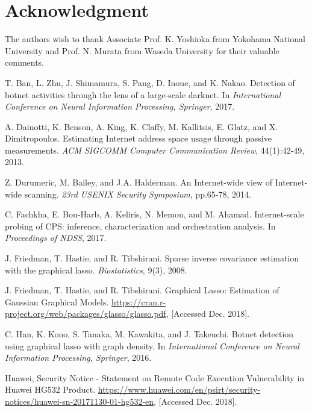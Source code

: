 \documentclass[conference]{IEEEtran}
\begin{document}
\section*{Acknowledgment}
The authors wish to thank Associate Prof. K. Yoshioka from Yokohama National University and  Prof. N. Murata from Waseda University for their valuable comments.


\begin{thebibliography}{99}

T. Ban, L. Zhu, J. Shimamura, S. Pang, D. Inoue, and K. Nakao. Detection of botnet activities through the lens of a large-scale darknet. In {\it International Conference on Neural Information Processing, Springer}, 2017.

A. Dainotti, K. Benson, A. King, K. Claffy, M. Kallitsis, E. Glatz, and X. Dimitropoulos. Estimating Internet address space usage through passive measurements. {\it ACM SIGCOMM Computer Communication Review}, 44(1):42-49, 2013.

Z. Durumeric, M. Bailey, and J.A. Halderman. An Internet-wide view of Internet-wide scanning. {\it 23rd USENIX Security Symposium}, pp.65-78, 2014.

C. Fachkha, E. Bou-Harb, A. Keliris, N. Memon, and M. Ahamad. Internet-scale probing of CPS: inference, characterization and orchestration analysis. In {\it Proceedings of NDSS}, 2017.

J. Friedman, T. Hastie, and R. Tibshirani. Sparse inverse covariance estimation with the graphical lasso. {\it Biostatistics}, 9(3), 2008.

J. Friedman, T. Hastie, and R. Tibshirani. Graphical Lasso: Estimation of Gaussian Graphical Models. \url{https://cran.r-project.org/web/packages/glasso/glasso.pdf}, [Accessed Dec. 2018].

C. Han, K. Kono, S. Tanaka, M. Kawakita, and J. Takeuchi. Botnet detection using graphical lasso with graph density. In {\it International Conference on Neural Information Processing, Springer}, 2016.

Huawei, Security Notice - Statement on Remote Code Execution Vulnerability in Huawei HG532 Product. \url{https://www.huawei.com/en/psirt/security-notices/huawei-sn-20171130-01-hg532-en}, [Accessed Dec. 2018].


\end{thebibliography}
\end{document}
